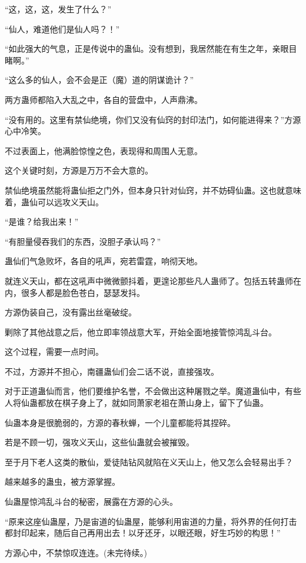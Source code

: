 \begin{this_body}
“这，这，这，发生了什么？”

“仙人，难道他们是仙人吗？！”

“如此强大的气息，正是传说中的蛊仙。没有想到，我居然能在有生之年，亲眼目睹啊。”

“这么多的仙人，会不会是正（魔）道的阴谋诡计？”

两方蛊师都陷入大乱之中，各自的营盘中，人声鼎沸。

“没有用的。这里有禁仙绝境，你们又没有仙窍的封印法门，如何能进得来？”方源心中冷笑。

不过表面上，他满脸惊惶之色，表现得和周围人无意。

这个关键时刻，方源是万万不会大意的。

禁仙绝境虽然能将蛊仙拒之门外，但本身只针对仙窍，并不妨碍仙蛊。这也就意味着，蛊仙可以远攻义天山。

“是谁？给我出来！”

“有胆量侵吞我们的东西，没胆子承认吗？”

蛊仙们气急败坏，各自的吼声，宛若雷霆，响彻天地。

就连义天山，都在这吼声中微微颤抖着，更遑论那些凡人蛊师了。包括五转蛊师在内，很多人都是脸色苍白，瑟瑟发抖。

方源伪装自己，没有露出丝毫破绽。

剿除了其他战意之后，他立即率领战意大军，开始全面地接管惊鸿乱斗台。

这个过程，需要一点时间。

不过，方源并不担心，南疆蛊仙们会二话不说，直接强攻。

对于正道蛊仙而言，他们要维护名誉，不会做出这种屠戮之举。魔道蛊仙中，有些人将仙蛊都放在棋子身上了，就如同萧家老祖在萧山身上，留下了仙蛊。

仙蛊本身是很脆弱的，方源的春秋蝉，一个儿童都能将其捏碎。

若是不顾一切，强攻义天山，这些仙蛊就会被摧毁。

至于月下老人这类的散仙，爱徒陆钻风就陷在义天山上，他又怎么会轻易出手？

越来越多的蛊虫，被方源掌握。

仙蛊屋惊鸿乱斗台的秘密，展露在方源的心头。

“原来这座仙蛊屋，乃是宙道的仙蛊屋，能够利用宙道的力量，将外界的任何打击都封印起来，随后自己再用出去！以牙还牙，以眼还眼，好生巧妙的构思！”

方源心中，不禁惊叹连连。(未完待续。)

\end{this_body}

